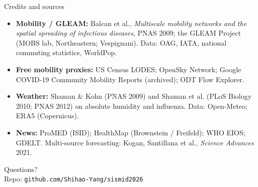 \documentclass[aspectratio=169,11pt]{beamer}
\begin{document}
\begin{frame}{Credits and sources}
  \footnotesize
  \begin{itemize}
    \item \textbf{Mobility / GLEAM:} Balcan et al., \emph{Multiscale mobility networks and
          the spatial spreading of infectious diseases}, PNAS 2009; the GLEAM Project (MOBS
          lab, Northeastern; Vespignani). Data: OAG, IATA, national commuting statistics,
          WorldPop.
    \item \textbf{Free mobility proxies:} US Census LODES; OpenSky Network; Google COVID-19
          Community Mobility Reports (archived); ODT Flow Explorer.
    \item \textbf{Weather:} Shaman \& Kohn (PNAS 2009) and Shaman et al. (PLoS Biology 2010;
          PNAS 2012) on absolute humidity and influenza. Data: Open-Meteo; ERA5 (Copernicus).
    \item \textbf{News:} ProMED (ISID); HealthMap (Brownstein / Freifeld); WHO EIOS; GDELT.
          Multi-source forecasting: Kogan, Santillana et al., \emph{Science Advances} 2021.
  \end{itemize}
\end{frame}

\begin{frame}[standout]
  Questions?\\[0.4em]
  \small Repo: \texttt{github.com/Shihao-Yang/sismid2026}
\end{frame}
\end{document}
